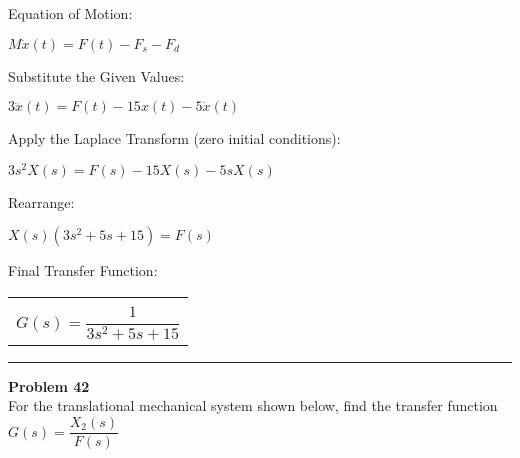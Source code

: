 \documentclass[11pt,letterpaper]{article}
\begin{document}
Equation of Motion:\\
\begin{center}
	$M\ddot{x}(t)=F(t)-F_{s}-F_{d}$\\[12pt]
\end{center}
Substitute the Given Values:\\
\begin{center}
	$3\ddot{x}(t)=F(t)-15x(t)-5\dot{x}(t)$\\
\end{center}
Apply the Laplace Transform (zero initial conditions):\\
\begin{center}
	$3s^2X(s)=F(s)-15X(s)-5sX(s)$\\[12pt]
\end{center}
Rearrange:\\
\begin{center}
	$X(s)(3s^2+5s+15)=F(s)$\\
\end{center}
Final Transfer Function:\\
\begin{center}
	\begin{tabular}{|c|}
		\hline \\
		$G(s)=\dfrac{1}{3s^2+5s+15}$\\[12pt]
		\hline
	\end{tabular}	
\end{center}

\clearpage
\rule{\textwidth}{1pt}
\textbf{Problem 42}\\
For the translational mechanical system shown below, find the transfer function $G(s)=\dfrac{X_2(s)}{F(s)}$\\
\end{document}
